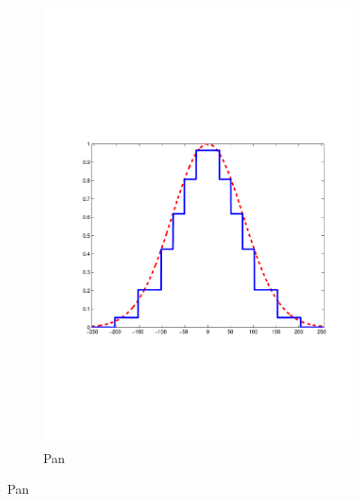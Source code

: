 \documentclass[twocolumn]{el-author}
\begin{document}
\begin{figure}[t]
\begin{subfigure}[b]{0.32\linewidth}
    \includegraphics[width=\linewidth, height= 0.6\linewidth]{Pan1}
    \caption{Pan~\cite{Pan_MPE_2014}}
    \label{fig:minimax_path:path}
\end{subfigure}


\end{figure}
\end{document}
